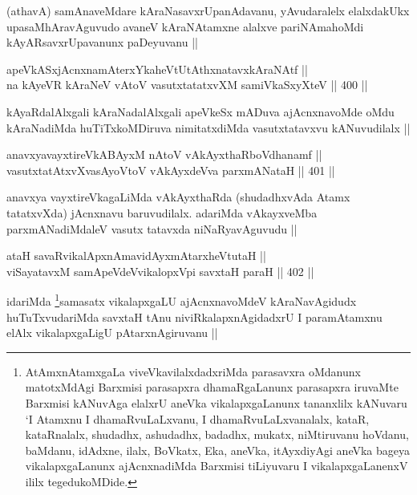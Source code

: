 \begin{artha}
(athavA) samAnaveMdare kAraNasavxrUpanAdavanu, yAvudaralelx elalxdakUkx upasaMhAravAguvudo avaneV kAraNAtamxne alalxve pariNAmahoMdi kAyARsavxrUpavanunx paDeyuvanu ||
\end{artha}


\begin{shl}
apeVkASxjAcnxnamAterxYkaheVtUtAthxnatavxkAraNAtf || \\
na kAyeVR kAraNeV vA\s toV vasutxtatatxvXM samiVkaSxyXteV ||  400 ||  
\end{shl}

\begin{artha}
kAyaRdalAlxgali kAraNadalAlxgali apeVkeSx mADuva ajAcnxnavoMde oMdu kAraNadiMda huTiTxkoMDiruva nimitatxdiMda vasutxtatavxvu kANuvudilalx ||
\end{artha}


\begin{shl}
anavxyavayxtireVkABAyxM nAtoV vAkAyxthaRboVdhanamf || \\
vasutxtatAtxvXvasAyoV\s toV vAkAyxdeVva parxmANataH ||  401 ||  
\end{shl}

\begin{artha}
anavxya vayxtireVkagaLiMda vAkAyxthaRda (shudadhxvAda Atamx tatatxvXda) jAcnxnavu baruvudilalx. adariMda vAkayxveMba parxmANadiMdaleV vasutx tatavxda niNaRyavAguvudu ||
\end{artha}


\begin{shl}
ataH savaRvikalApxnAmavidAyxmAtarxheVtutaH || \\
viSayatavxM samApeVdeV\s vikalopxV\s pi savxtaH paraH ||  402 ||  
\end{shl}

\begin{artha}
idariMda \footnote{AtAmxnAtamxgaLa viveVkavilalxdadxriMda parasavxra oMdanunx matotxMdAgi Barxmisi parasapxra dhamaRgaLanunx parasapxra iruvaMte Barxmisi kANuvAga elalxrU aneVka vikalapxgaLanunx tananxlilx kANuvaru `I Atamxnu I dhamaRvuLaLxvanu, I dhamaRvuLaLxvanalalx, kataR, kataRnalalx, shudadhx, ashudadhx, badadhx, mukatx, niMtiruvanu hoVdanu, baMdanu, idAdxne, ilalx, BoVkatx, Eka, aneVka, itAyxdiyAgi aneVka bageya vikalapxgaLanunx ajAcnxnadiMda Barxmisi tiLiyuvaru I vikalapxgaLanenxV ililx tegedukoMDide.}samasatx vikalapxgaLU ajAcnxnavoMdeV kAraNavAgidudx huTuTxvudariMda savxtaH tAnu niviRkalapxnAgidadxrU I paramAtamxnu elAlx vikalapxgaLigU pAtarxnAgiruvanu ||
\end{artha}

